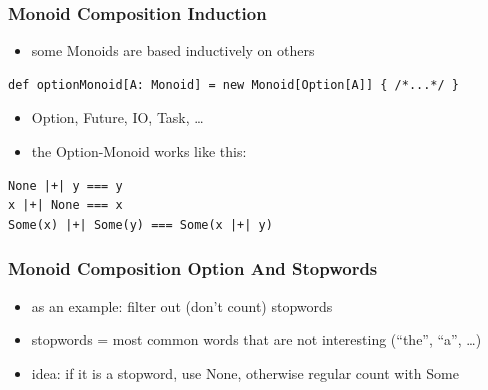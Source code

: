 \documentclass[aspectratio=169]{beamer}
\begin{document}
\begin{frame}[fragile]
  \frametitle{Monoid Composition \textemdash{} Induction}
  \begin{itemize}
  \item some Monoids are based inductively on others
  \end{itemize}
  \begin{verbatim}
def optionMonoid[A: Monoid] = new Monoid[Option[A]] { /*...*/ }
  \end{verbatim}
  \begin{itemize}
  \item Option, Future, IO, Task, \ldots{}
  \item the Option-Monoid works like this:
  \end{itemize}
  \begin{center}
    \vspace{5mm}
    \begin{verbatim}
None |+| y === y
x |+| None === x
Some(x) |+| Some(y) === Some(x |+| y)
    \end{verbatim}
  \end{center}
\end{frame}

\begin{frame}[fragile]
  \frametitle{Monoid Composition \textemdash{} Option And Stopwords}
  \begin{itemize}
  \item as an example: filter out (don't count) stopwords
  \item stopwords = most common words that are not interesting (``the'', ``a'', \ldots{})
  \item idea: if it is a stopword, use None, otherwise regular count with Some
  \end{itemize}
\end{frame}
\end{document}
